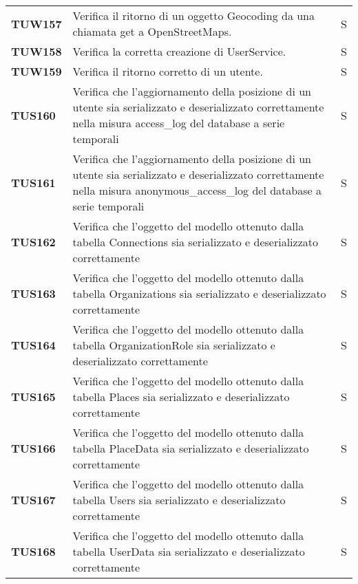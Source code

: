 \documentclass[../../piano-di-qualifica.tex]{subfiles}
\begin{document}
\begin{longtable}[H]{>{\centering\bfseries}m{3cm} >{}m{10cm} >{\centering\arraybackslash}m{3cm}}
  TUW157             & Verifica il ritorno di un oggetto Geocoding da una chiamata get a OpenStreetMaps.                                   & S                             \\


  TUW158             & Verifica la corretta creazione di UserService.                                                                      & S                             \\

  TUW159             & Verifica il ritorno corretto di un utente.                                                                          & S                             \\


  TUS160 & Verifica che l'aggiornamento della posizione di un utente sia serializzato e deserializzato correttamente nella misura access\_log del database a serie temporali & S \\
  TUS161 & Verifica che l'aggiornamento della posizione di un utente sia serializzato e deserializzato correttamente nella misura anonymous\_access\_log del database a serie temporali & S \\


  TUS162 & Verifica che l'oggetto del modello ottenuto dalla tabella Connections sia serializzato e deserializzato correttamente & S \\
  TUS163 & Verifica che l'oggetto del modello ottenuto dalla tabella Organizations sia serializzato e deserializzato correttamente & S \\
  TUS164 & Verifica che l'oggetto del modello ottenuto dalla tabella OrganizationRole sia serializzato e deserializzato correttamente & S \\
  TUS165 & Verifica che l'oggetto del modello ottenuto dalla tabella Places sia serializzato e deserializzato correttamente & S \\
  TUS166 & Verifica che l'oggetto del modello ottenuto dalla tabella PlaceData sia serializzato e deserializzato correttamente & S \\
  TUS167 & Verifica che l'oggetto del modello ottenuto dalla tabella Users sia serializzato e deserializzato correttamente & S \\
  TUS168 & Verifica che l'oggetto del modello ottenuto dalla tabella UserData sia serializzato e deserializzato correttamente & S \\


\end{longtable}
\end{document}
